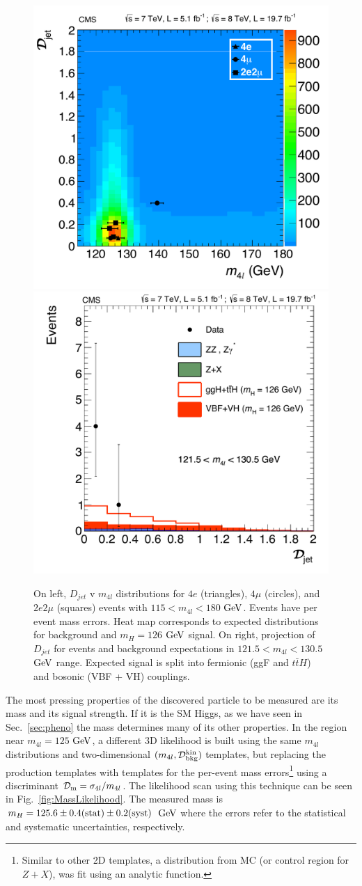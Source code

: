 \begin{figure}[htbp]
\begin{center}
\includegraphics[width=.45\linewidth]{HiggsDiscovery/figures/M4l_vs_Fisher_all.pdf}
\includegraphics[width=.45\linewidth]{HiggsDiscovery/figures/FisherPeak.pdf}
\caption[Observed $D_{jet}$ Distributions for Low Mass $4l$ Events With Signal Expectations]{On left, $D_{jet}$ v $m_{4l}$ distributions for $4e$ (triangles), $4\mu$ (circles), and $2e2\mu$ (squares) events with $115 < m_{4l} < 180$ $\rm{GeV}$. Events have per event mass errors. Heat map corresponds to expected distributions for background and $m_H = 126$ $\rm{GeV}$ signal. On right, projection of $D_{jet}$ for events and background expectations in $121.5 < m_{4l} < 130.5$ $\rm{GeV}$ range. Expected signal is split into fermionic (ggF and $t\bar{t}H$) and bosonic (VBF + VH) couplings.}
\label{fig:Fisher_Results}
\end{center}
\end{figure}

The most pressing properties of the discovered particle to be measured are its mass and its signal strength. If it is the SM Higgs, as we have seen in Sec.~\ref{sec:pheno} the mass determines many of its other properties. In the region near $m_{4l}=125$ $\rm{GeV}$, a different 3D likelihood is built using the same $m_{4l}$ distributions and two-dimensional $(m_{4l},\mathcal{D}_{\rm{bkg}}^{\rm{kin}})$ templates, but replacing the production templates with templates for the per-event mass errors\footnote{Similar to other 2D templates, a distribution from MC (or control region for $Z+X$), was fit using an analytic function.} using a discriminant $\mathcal{D}_{\rm{m}}=\sigma_{4l}/m_{4l}$. The likelihood scan using this technique can be seen in Fig.~\ref{fig:MassLikelihood}. The measured mass is $m_H = 125.6 \pm 0.4(\rm{stat}) \pm 0.2(\rm{syst})$ $\rm{GeV}$ where the errors refer to the statistical and systematic uncertainties, respectively.

